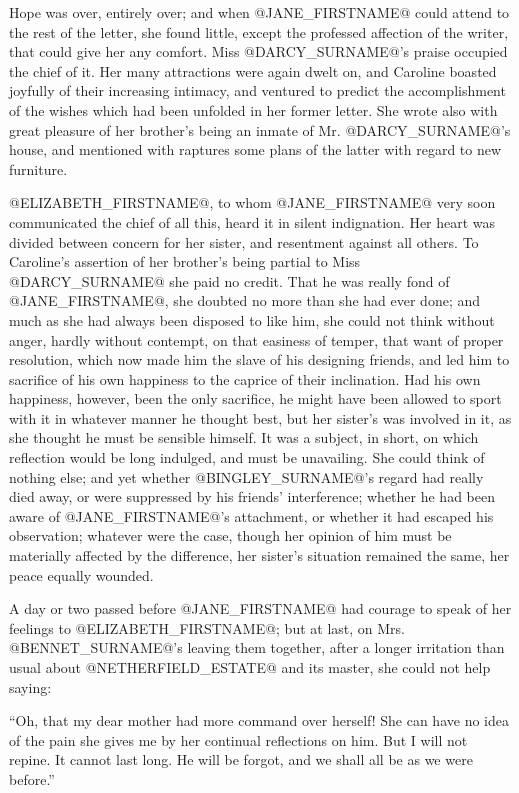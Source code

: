 Hope was over, entirely over; and when @JANE_FIRSTNAME@ could attend to the rest
of the letter, she found little, except the professed affection of the
writer, that could give her any comfort. Miss @DARCY_SURNAME@'s praise occupied
the chief of it. Her many attractions were again dwelt on, and Caroline
boasted joyfully of their increasing intimacy, and ventured to predict
the accomplishment of the wishes which had been unfolded in her former
letter. She wrote also with great pleasure of her brother's being an
inmate of Mr. @DARCY_SURNAME@'s house, and mentioned with raptures some plans of
the latter with regard to new furniture.

@ELIZABETH_FIRSTNAME@, to whom @JANE_FIRSTNAME@ very soon communicated the chief of all this,
heard it in silent indignation. Her heart was divided between concern
for her sister, and resentment against all others. To Caroline's
assertion of her brother's being partial to Miss @DARCY_SURNAME@ she paid no
credit. That he was really fond of @JANE_FIRSTNAME@, she doubted no more than she
had ever done; and much as she had always been disposed to like him, she
could not think without anger, hardly without contempt, on that easiness
of temper, that want of proper resolution, which now made him the slave
of his designing friends, and led him to sacrifice of his own happiness
to the caprice of their inclination. Had his own happiness, however,
been the only sacrifice, he might have been allowed to sport with it in
whatever manner he thought best, but her sister's was involved in it, as
she thought he must be sensible himself. It was a subject, in short,
on which reflection would be long indulged, and must be unavailing. She
could think of nothing else; and yet whether @BINGLEY_SURNAME@'s regard had really
died away, or were suppressed by his friends' interference; whether
he had been aware of @JANE_FIRSTNAME@'s attachment, or whether it had escaped his
observation; whatever were the case, though her opinion of him must be
materially affected by the difference, her sister's situation remained
the same, her peace equally wounded.

A day or two passed before @JANE_FIRSTNAME@ had courage to speak of her feelings to
@ELIZABETH_FIRSTNAME@; but at last, on Mrs. @BENNET_SURNAME@'s leaving them together, after a
longer irritation than usual about @NETHERFIELD_ESTATE@ and its master, she could
not help saying:

``Oh, that my dear mother had more command over herself! She can have no
idea of the pain she gives me by her continual reflections on him. But
I will not repine. It cannot last long. He will be forgot, and we shall
all be as we were before.''

